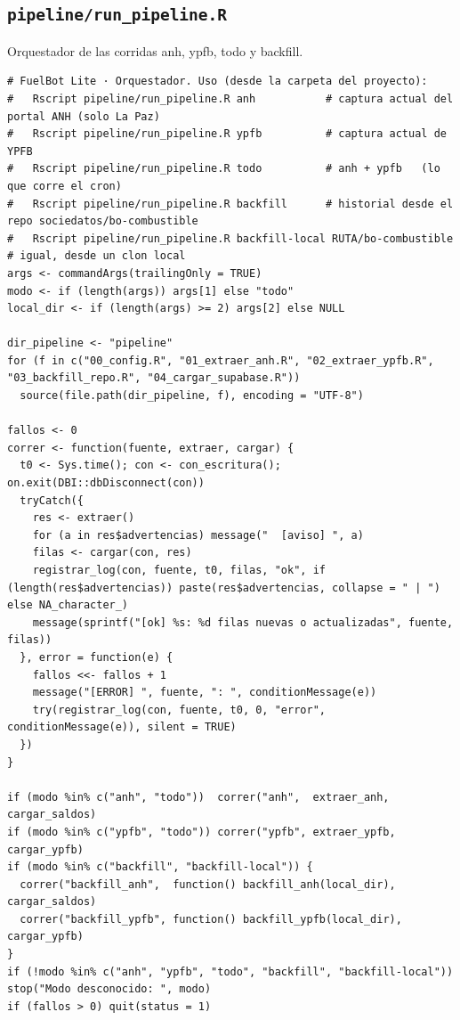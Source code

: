 \subsection{\texttt{pipeline/run\_pipeline.R}}
Orquestador de las corridas anh, ypfb, todo y backfill.
\begin{lstlisting}[style=anexoR]
# FuelBot Lite · Orquestador. Uso (desde la carpeta del proyecto):
#   Rscript pipeline/run_pipeline.R anh           # captura actual del portal ANH (solo La Paz)
#   Rscript pipeline/run_pipeline.R ypfb          # captura actual de YPFB
#   Rscript pipeline/run_pipeline.R todo          # anh + ypfb   (lo que corre el cron)
#   Rscript pipeline/run_pipeline.R backfill      # historial desde el repo sociedatos/bo-combustible
#   Rscript pipeline/run_pipeline.R backfill-local RUTA/bo-combustible   # igual, desde un clon local
args <- commandArgs(trailingOnly = TRUE)
modo <- if (length(args)) args[1] else "todo"
local_dir <- if (length(args) >= 2) args[2] else NULL

dir_pipeline <- "pipeline"
for (f in c("00_config.R", "01_extraer_anh.R", "02_extraer_ypfb.R", "03_backfill_repo.R", "04_cargar_supabase.R"))
  source(file.path(dir_pipeline, f), encoding = "UTF-8")

fallos <- 0
correr <- function(fuente, extraer, cargar) {
  t0 <- Sys.time(); con <- con_escritura(); on.exit(DBI::dbDisconnect(con))
  tryCatch({
    res <- extraer()
    for (a in res$advertencias) message("  [aviso] ", a)
    filas <- cargar(con, res)
    registrar_log(con, fuente, t0, filas, "ok", if (length(res$advertencias)) paste(res$advertencias, collapse = " | ") else NA_character_)
    message(sprintf("[ok] %s: %d filas nuevas o actualizadas", fuente, filas))
  }, error = function(e) {
    fallos <<- fallos + 1
    message("[ERROR] ", fuente, ": ", conditionMessage(e))
    try(registrar_log(con, fuente, t0, 0, "error", conditionMessage(e)), silent = TRUE)
  })
}

if (modo %in% c("anh", "todo"))  correr("anh",  extraer_anh,  cargar_saldos)
if (modo %in% c("ypfb", "todo")) correr("ypfb", extraer_ypfb, cargar_ypfb)
if (modo %in% c("backfill", "backfill-local")) {
  correr("backfill_anh",  function() backfill_anh(local_dir),  cargar_saldos)
  correr("backfill_ypfb", function() backfill_ypfb(local_dir), cargar_ypfb)
}
if (!modo %in% c("anh", "ypfb", "todo", "backfill", "backfill-local")) stop("Modo desconocido: ", modo)
if (fallos > 0) quit(status = 1)
\end{lstlisting}

